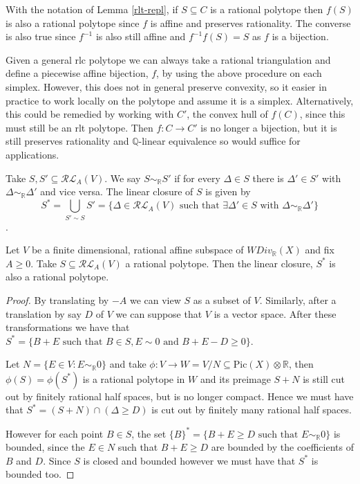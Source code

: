 \begin{remark}
	With the notation of Lemma \ref{rlt-repl}, if $S \subseteq C$ is a rational polytope then $f(S)$ is also a rational polytope since $f$ is affine and preserves rationality. The converse is also true since $f^{-1}$ is also still affine and $f^{-1}f(S)=S$ as $f$ is a bijection.  
\end{remark}


	Given a general rlc polytope we can always take a rational triangulation and define a piecewise affine bijection, $f$, by using the above procedure on each simplex. However, this does not in general preserve convexity, so it easier in practice to work locally on the polytope and assume it is a simplex. Alternatively, this could be remedied by working with $C'$, the convex hull of $f(C)$, since this must still be an rlt polytope. Then $f\colon C \to C'$ is no longer a bijection, but it is still preserves rationality and $\mathbb{Q}$-linear equivalence so would suffice for applications. 

	
	\begin{definition}
		Take $S, S' \subseteq \mathcal{RL}_{A}(V)$. We say $S \sim_{\mathbb{R}} S'$ if for every $\Delta \in S$ there is $\Delta' \in S'$ with $\Delta \sim_{\mathbb{R}} \Delta'$ and vice versa. The linear closure of $S$ is given by $$S^{*}=\bigcup_{S' \sim S}S'= \{\Delta \in \mathcal{RL}_{A}(V) \text{ such that } \exists \Delta' \in S \text{ with }\Delta \sim_{\mathbb{R}} \Delta'\}$$.
	\end{definition}
	
	

	\begin{lemma}
		Let $V$ be a finite dimensional, rational affine subspace of $WDiv_{\mathbb{R}}(X)$ and fix $A \geq 0$. Take $S \subseteq \mathcal{RL}_{A}(V)$ a rational polytope. Then the linear closure, $S^{*}$ is also a rational polytope. 
	\end{lemma}
	
	\begin{proof}
		By translating by $-A$ we can view $S$ as a subset of $V$. Similarly, after a translation by say $D$ of $V$ we can suppose that $V$ is a vector space. After these transformations we have that $S^{*}=\{B+E \text{ such that } B\in S, E \sim 0 \text{ and } B+E -D \geq 0\}$.
		
		
		Let $N=\{E \in V: E \sim_{\mathbb{R}} 0\}$ and take $\phi:V \to W=V/N \subseteq \text{Pic}(X)\otimes \mathbb{R}$, then $\phi(S)=\phi(S^{*})$ is a rational polytope in $W$ and its preimage $S+N$ is still cut out by finitely rational half spaces, but is no longer compact. Hence we must have that $S^{*}=(S+N)\cap({\Delta \geq D})$ is cut out by finitely many rational half spaces. 
		
		However for each point $B \in S$, the set $\{B\}^{*}=\{B+E\geq D \text{ such that } E \sim_{\mathbb{R}} 0\}$ is bounded, since the $E\in N$ such that $B+E \geq D$ are bounded by the coefficients of $B$ and $D$. Since $S$ is closed and bounded however we must have that $S^{*}$ is bounded too.
	\end{proof}
	

